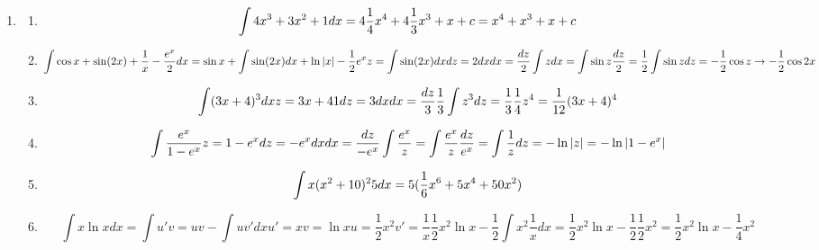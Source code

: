 \documentclass[12pt,a4paper]{scrreprt}
\begin{document}
\begin{enumerate}

\item	%

\begin{enumerate}

\item %

\[
\int 4x^3 +3x^2 +1	dx\\
=	4\frac{1}{4}x^4 +4\frac{1}{3}x^3 +x +c \\
= x^4 + x^3 +x +c
\]

\item %

\[
\int \cos x + \sin(2x) +\frac{1}{x} -\frac{e^x}{2}	dx\\
= \sin x + \int \sin(2x) dx + \ln |x| -\frac{1}{2}e^x \\
z = \int \sin(2x) dx \\
dz = 2dx \\
dx=\frac{dz}{2} \\
\int z dx = \int \sin z \frac{dz}{2} = \frac{1}{2} \int \sin z dz = -\frac{1}{2}\cos z \rightarrow -\frac{1}{2}\cos 2x \\
\]

\item %

\[
\int (3x+4)^3 dx \\
z=3x+4 \\
1 dz = 3dx \\
dx = \frac{dz}{3} \\
\frac{1}{3} \int z^3 dz = \frac{1}{3} \frac{1}{4} z^4 = \frac{1}{12} (3x+4)^4
\]

\item %

\[
\int \frac{e^x}{1-e^x} \\
z = 1-e^x \\
dz = -e^x dx
dx = \frac{dz}{-e^x}
\int \frac{e^x}{z} \\
= \int \frac{e^x}{z} \frac{dz}{e^x} = \int \frac{1}{z} dz \\
= -\ln|z| = -\ln |1-e^x|
\]

\item %

\[
\int x(x^2+10)^2 5  dx \\
= 5(\frac{1}{6}x^6 +5x^4 +50x^2)
\]

\item %

\[
\int x \ln x dx
= \int u'v = uv-\int uv' dx
u'=x
v =\ln x
u =\frac{1}{2}x^2
v'=\frac{1}{x}
\frac{1}{2}x^2 \ln x -\frac{1}{2}\int x^2 \frac{1}{x} dx
= \frac{1}{2}x^2 \ln x -\frac{1}{2}\frac{1}{2}x^2
= \frac{1}{2}x^2 \ln x -\frac{1}{4}x^2
\]


\end{enumerate}
\end{enumerate}
\end{document}
